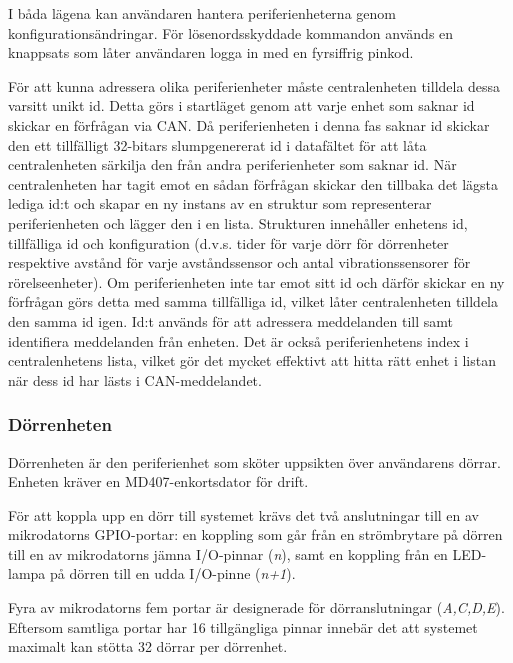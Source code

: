 \documentclass{article}
\begin{document}
I båda lägena kan användaren hantera periferienheterna genom konfigurationsändringar. För lösenordsskyddade kommandon används en knappsats som låter användaren logga in med en fyrsiffrig pinkod. 


För att kunna adressera olika periferienheter måste centralenheten tilldela dessa varsitt unikt id.
Detta görs i startläget genom att varje enhet som saknar id skickar en förfrågan via CAN. Då periferienheten i denna fas saknar id skickar den ett tillfälligt 32-bitars slumpgenererat id i datafältet för att låta centralenheten särkilja den från andra periferienheter som saknar id.
När centralenheten har tagit emot en sådan förfrågan skickar den tillbaka det lägsta lediga id:t och skapar en ny instans av en struktur som representerar periferienheten och lägger den i en lista. Strukturen innehåller enhetens id, tillfälliga id och konfiguration (d.v.s. tider för varje dörr för dörrenheter respektive avstånd för varje avståndssensor och antal vibrationssensorer för rörelseenheter). Om periferienheten inte tar emot sitt id och därför skickar en ny förfrågan görs detta med samma tillfälliga id, vilket låter centralenheten tilldela den samma id igen.
Id:t används för att adressera meddelanden till samt identifiera meddelanden från enheten. Det är också periferienhetens index i centralenhetens lista, vilket gör det mycket effektivt att hitta rätt enhet i listan när dess id har lästs i CAN-meddelandet.


\subsubsection{Dörrenheten}
\label{subsec:Dörrenheten}

Dörrenheten är den periferienhet som sköter uppsikten över användarens dörrar. Enheten kräver en MD407-enkortsdator för drift.

För att koppla upp en dörr till systemet krävs det två anslutningar till en av mikrodatorns GPIO-portar: en koppling som går från en strömbrytare på dörren till en av mikrodatorns jämna I/O-pinnar (\textit{n}), samt en koppling från en LED-lampa på dörren till en udda I/O-pinne (\textit{n+1}).

Fyra av mikrodatorns fem portar är designerade för dörranslutningar (\textit{A,C,D,E}). \\
Eftersom samtliga portar har 16 tillgängliga pinnar innebär det att systemet maximalt kan stötta 32 dörrar per dörrenhet.
\end{document}
